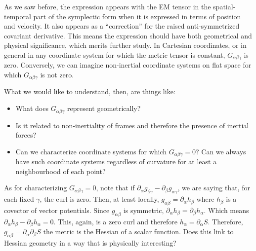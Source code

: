 
As we saw before, the expression appears with the EM tensor in the spatial-temporal part of the symplectic form when it is expressed in terms of position and velocity. It also appears as a “correction” for the raised anti-symmetrized covariant derivative. This means the expression should have both geometrical and physical significance, which merits further study. In Cartesian coordinates, or in general in any coordinate system for which the metric tensor is constant, $G_{\alpha\beta\gamma}$ is zero. Conversely, we can imagine non-inertial coordinate systems on flat space for which $G_{\alpha\beta\gamma}$ is not zero.

What we would like to understand, then, are things like:
\begin{itemize}
	\item What does $G_{\alpha\beta\gamma}$ represent geometrically?
	\item Is it related to non-inertiality of frames and therefore the presence of inertial forces?
	\item Can we characterize coordinate systems for which $G_{\alpha\beta\gamma}=0$? Can we always have such coordinate systems regardless of curvature for at least a neighbourhood of each point?
\end{itemize}

As for characterizing $G_{\alpha\beta\gamma}=0$, note that if $\partial_{\alpha} g_{\beta \gamma} - \partial_{\beta} g_{\alpha \gamma}$, we are saying that, for each fixed $\gamma$, the curl is zero. Then, at least locally, $g_{\alpha \beta} = \partial_\alpha h_\beta$ where $h_\beta$ is a covector of vector potentials. Since $g_{\alpha \beta}$ is symmetric, $\partial_\alpha h_\beta = \partial_\beta h_\alpha$. Which means $\partial_\alpha h_\beta - \partial_\beta h_\alpha = 0$. This, again, is a zero curl and therefore $h_\alpha = \partial_\alpha S$. Therefore, $g_{\alpha\beta} = \partial_\alpha \partial_\beta S$ the metric is the Hessian of a scalar function. Does this link to Hessian geometry in a way that is physically interesting?

